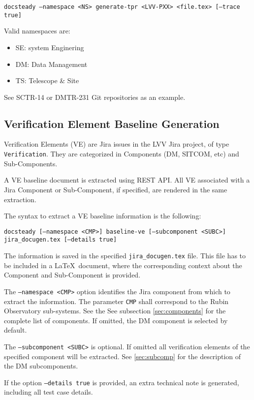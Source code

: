 \documentclass[DM]{lsstdoc}
\begin{document}
\texttt{docsteady --namespace <NS> generate-tpr <LVV-PXX> <file.tex> [--trace true]}

Valid namespaces are:

\begin{itemize}
\item SE: system Enginering
\item DM: Data Management
\item TS: Telescope \& Site
\end{itemize}

See SCTR-14 or DMTR-231 Git repositories as an example.



\subsection{Verification Element Baseline Generation}

Verification Elements (VE) are Jira issues in the LVV Jira project, of type \texttt{Verification}.
They are categorized in Components (DM, SITCOM, etc) and Sub-Components.

A VE baseline document is extracted using REST API.
All VE associated with a Jira Component or Sub-Component, if specified, are rendered in the same extraction.

The syntax to extract a VE baseline information is the following:

\texttt{docsteady [--namespace <CMP>] baseline-ve [--subcomponent <SUBC>] jira\_docugen.tex [--details true]}

The information is saved in the specified \texttt{jira\_docugen.tex} file.
This file has to be included in a \LaTeX~document, where the corresponding context about the Component and Sub-Component is provided.

The \texttt{--namespace <CMP>} option identifies the Jira component from which to extract the information.
The parameter \texttt{CMP} shall correspond to the Rubin Observatory sub-systems.
See the See subsection \ref{sec:components} for the complete list of components.
If omitted, the DM component is selected by default.

The \texttt{--subcomponent <SUBC>} is optional. If omitted all verification elements of the specified component will be extracted. 
See \ref{sec:subcomp} for the description of the DM subcomponents.

If the option \texttt{--details true} is provided, an extra technical note is generated, including all test case details.
\end{document}
